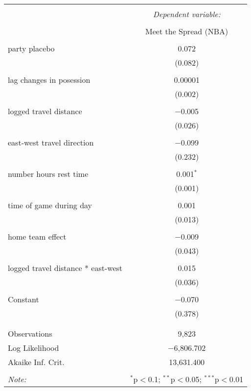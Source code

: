 \documentclass[letterpaper,12pt]{article}
\begin{document}
\begin{tabular}{@{\extracolsep{5pt}}lc}  \\[-1.8ex]\hline  \hline \\[-1.8ex]   & \multicolumn{1}{c}{\textit{Dependent variable:}} \\  \cline{2-2}  \\[-1.8ex] & Meet the Spread (NBA) \\  \hline \\[-1.8ex]   party placebo & 0.072 \\    & (0.082) \\    & \\   lag changes in posession & 0.00001 \\    & (0.002) \\    & \\   logged travel distance & $-$0.005 \\    & (0.026) \\    & \\   east-west travel direction & $-$0.099 \\    & (0.232) \\    & \\   number hours rest time & 0.001$^{*}$ \\    & (0.001) \\    & \\   time of game during day & 0.001 \\    & (0.013) \\    & \\   home team effect & $-$0.009 \\    & (0.043) \\    & \\   logged travel distance * east-west & 0.015 \\    & (0.036) \\    & \\   Constant & $-$0.070 \\    & (0.378) \\    & \\  \hline \\[-1.8ex]  Observations & 9,823 \\  Log Likelihood & $-$6,806.702 \\  Akaike Inf. Crit. & 13,631.400 \\  \hline  \hline \\[-1.8ex]  \textit{Note:}  & \multicolumn{1}{r}{$^{*}$p$<$0.1; $^{**}$p$<$0.05; $^{***}$p$<$0.01} \\  \end{tabular}  
\end{document}
